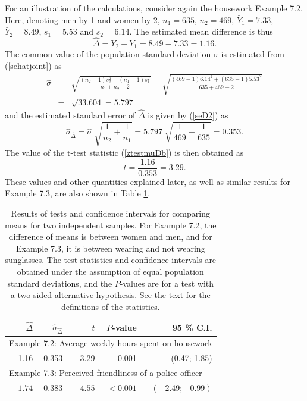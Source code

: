 For an
illustration of the calculations, consider again the housework Example
7.2. Here, denoting
men by 1 and women by 2, $n_{1}=635$, $n_{2}=469$, $\bar{Y}_{1}=7.33$,
$\bar{Y}_{2}=8.49$, $s_{1}=5.53$ and $s_{2}=6.14$. The estimated mean
difference is thus
\[
\hat{\Delta}=\bar{Y}_{2}-\bar{Y}_{1}=8.49-7.33=1.16.
\]
The common value of the population standard deviation $\sigma$ is
estimated from (\ref{sehatjoint}) as
\begin{eqnarray*}
\hat{\sigma}&=&
\sqrt{\frac{(n_{2}-1)s^{2}_{2}+(n_{1}-1)s^{2}_{1}}{n_{1}+n_{2}-2}}
=
\sqrt{\frac{(469-1) 6.14^{2}+(635-1) 5.53^{2}}{635+469-2}}\\
&=& \sqrt{33.604}=5.797
\end{eqnarray*}
and the estimated standard error of $\hat{\Delta}$ is given by
(\ref{seD2}) as
\[
\hat{\sigma}_{\hat{\Delta}} =
\hat{\sigma} \; \sqrt{\frac{1}{n_{2}}+\frac{1}{n_{1}}}
=5.797 \; \sqrt{\frac{1}{469}+\frac{1}{635}}=0.353.
\]
The value of the t-test statistic (\ref{ztestmuDb}) is then obtained as
\[
t=\frac{1.16}{0.353}=3.29.
\]
These values and other quantities explained later, as well as similar
results for Example 7.3, are also shown in Table \ref{t_2testsY1}.

\begin{table}
\caption{Results of tests and confidence intervals for comparing
means for two independent samples. For Example 7.2, the difference of
means is between women and men, and for Example 7.3, it is between
wearing and not wearing sunglasses.
The test statistics and confidence intervals are obtained under the
assumption of equal population standard deviations, and
the $P$-values are for a test with a
two-sided alternative hypothesis. See the text for the
definitions of the statistics.}
\label{t_2testsY1}
\begin{center}
\begin{tabular}{|rrrrr|}\hline

$\hat{\Delta}$ &
$\hat{\sigma}_{\hat{\Delta}}$ & $t$ & $P$-value & 95 \% C.I. \\ \hline
\multicolumn{5}{|l|}{Example 7.2: Average weekly hours spent on
housework} \\
1.16 & 0.353 & 3.29 & 0.001 & (0.47; 1.85) \\  \hline
\multicolumn{5}{|l|}{Example 7.3: Perceived friendliness of a police
officer} \\
$-1.74$ & 0.383 & $-4.55$ & $<0.001$ & $(-2.49; -0.99)$
\\
\hline
\end{tabular}
\end{center}
\end{table}

